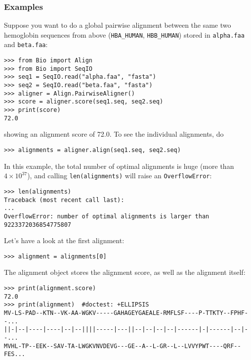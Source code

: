 \subsubsection{Examples}
\label{sec:pairwise-examples}

Suppose you want to do a global pairwise alignment between the same two
hemoglobin sequences from above (\texttt{HBA\_HUMAN}, \texttt{HBB\_HUMAN})
stored in \texttt{alpha.faa} and \texttt{beta.faa}:

\begin{verbatim}
>>> from Bio import Align
>>> from Bio import SeqIO
>>> seq1 = SeqIO.read("alpha.faa", "fasta")
>>> seq2 = SeqIO.read("beta.faa", "fasta")
>>> aligner = Align.PairwiseAligner()
>>> score = aligner.score(seq1.seq, seq2.seq)
>>> print(score)
72.0
\end{verbatim}

showing an alignment score of 72.0. To see the individual alignments, do

\begin{verbatim}
>>> alignments = aligner.align(seq1.seq, seq2.seq)
\end{verbatim}
In this example, the total number of optimal alignments is huge (more than $4 \times 10^{37}$), and calling \verb+len(alignments)+ will raise an \verb+OverflowError+:

\begin{verbatim}
>>> len(alignments)
Traceback (most recent call last):
...
OverflowError: number of optimal alignments is larger than 9223372036854775807
\end{verbatim}
Let's have a look at the first alignment:

\begin{verbatim}
>>> alignment = alignments[0]
\end{verbatim}

The alignment object stores the alignment score, as well as the alignment
itself:

\begin{verbatim}
>>> print(alignment.score)
72.0
>>> print(alignment)  #doctest: +ELLIPSIS
MV-LS-PAD--KTN--VK-AA-WGKV-----GAHAGEYGAEALE-RMFLSF----P-TTKTY--FPHF--...
||-|--|----|----|--|--||||-----|---||--|--|--|--|------|-|------|--|--...
MVHL-TP--EEK--SAV-TA-LWGKVNVDEVG---GE--A--L-GR--L--LVVYPWT----QRF--FES...
\end{verbatim}

